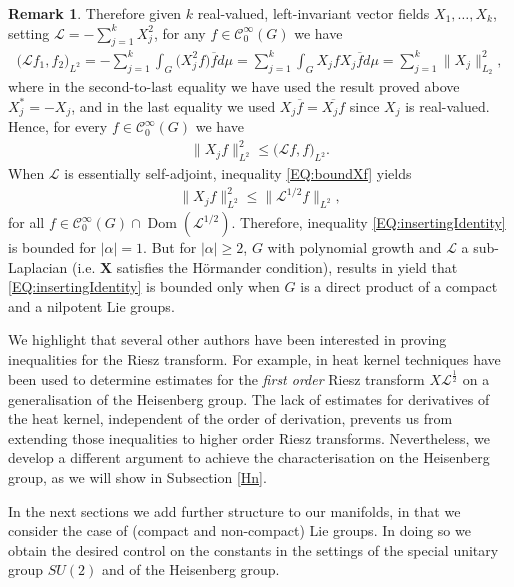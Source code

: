 \documentclass[12pt,oneside,a4paper]{book}
\numberwithin{equation}{section}     %
\theoremstyle{plain}
\theoremstyle{definition}
\newtheorem{remark}[theorem]{Remark}
\DeclareMathOperator{\Dom}{Dom}
\newcommand{\slp}{{\mathcal L}}
\begin{document}
\begin{remark}
	Therefore given $k$ real-valued, left-invariant vector fields $X_1,\dots,X_k$, setting $\slp=-\sum_{j=1}^kX_j^2$, for any $f\in\mathcal{C}_0^\infty(G)$ we have
	\begin{align*}
	\big(\slp f_1,f_2\big)_{L^2}=-\sum_{j=1}^k\int_G\big(X_j^2f\big)\overline{f}d\mu=\sum_{j=1}^k\int_GX_jfX_j\overline{f}d\mu=\sum_{j=1}^k\|X_j\|_{L_2}^2,
	\end{align*}
	where in the second-to-last equality we have used the result proved above $X_j^*=-X_j$, and in the last equality we used $X_j\overline{f}=\overline{X_jf}$ since $X_j$ is real-valued. Hence, for every $f\in\mathcal{C}_0^\infty(G)$ we have
	\begin{align}\label{EQ:boundXf}
	\|X_jf\|_{L^2}^2\leq  \big(\slp f,f\big)_{L^2}.   
	\end{align}
	When $\slp$ is essentially self-adjoint, inequality \eqref{EQ:boundXf} yields
	\begin{align*}
	\|X_jf\|_{L^2}^2\leq\|\slp^{1/2}f\|_{L^2},
	\end{align*} 
	for all $f\in\mathcal{C}_0^\infty(G)\cap\Dom(\slp^{1/2})$. Therefore, inequality \eqref{EQ:insertingIdentity} is bounded for $|\alpha|=1$. But for $|\alpha|\geq 2$, $G$ with polynomial growth and $\slp$ a sub-Laplacian (i.e. $\mathbf{X}$ satisfies the H\"ormander condition), results in \cite{ER1999} yield that \eqref{EQ:insertingIdentity} is bounded only when $G$ is a direct product of a compact and a nilpotent Lie groups.  
	
	We highlight that several other authors have been interested in proving inequalities for the Riesz transform. For example, in \cite{CMZ1996, LP2004} heat kernel techniques have been used to determine estimates for the \textit{first order} Riesz transform $X\slp^{\frac{1}{2}}$ on a generalisation of the Heisenberg group. The lack of estimates for derivatives of the heat kernel, independent of the order of derivation, prevents us from extending those inequalities to higher order Riesz transforms. Nevertheless, we develop a different argument to achieve the characterisation on the Heisenberg group, as we will show in Subsection \ref{Hn}.  
\end{remark}


In the next sections we add further structure to our manifolds, in that we consider the case of (compact and non-compact) Lie groups. In doing so we obtain the desired control on the constants in the settings of the special unitary group $SU(2)$ and of the Heisenberg group.
\end{document}
